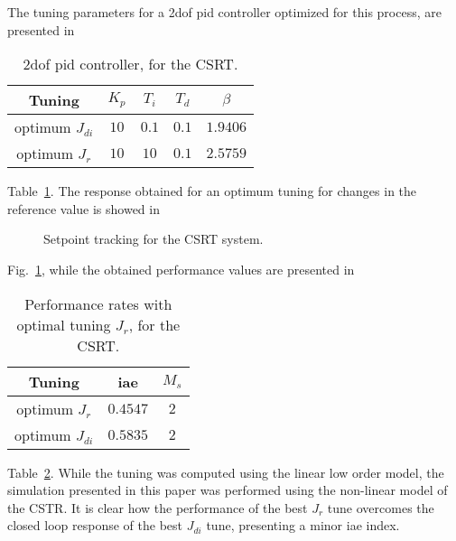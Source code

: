 The tuning parameters for a \gls{2dof} \gls{pid} controller optimized for this process, are presented in %
%
\begin{table}
	\caption{\gls{2dof} \gls{pid} controller, for the CSRT.}
	\centering
	\begin{tabular}{@{}*{5}{c}@{}}
		\toprule
		Tuning              &$K_p$       &$T_i$      &$T_d$     & $\beta$ 	\\
		\midrule              
		optimum $J_{di}$     &$10$   & $0.1$  &$0.1$  &$1.9406$   \\
		optimum $J_{r}$      &$10$   & $10$  &$0.1$  &$2.5759$   \\
		\bottomrule				
	\end{tabular}
	\label{tab:parametrosCSRT}
\end{table}
%
Table~\ref{tab:parametrosCSRT}. The response obtained for an optimum tuning for changes in the reference value is showed in %
%
\begin{figure}%
	\centering
	
	\caption{Setpoint tracking for the CSRT system.}%
	\label{fig:cambiorCSRT}%
\end{figure}
%
Fig.~\ref{fig:cambiorCSRT}, while the obtained performance values are presented in %
%
\begin{table}
	\caption{Performance rates with optimal tuning $J_{r}$, for the CSRT.}
	\centering
	\begin{tabular}{@{}*{3}{c}@{}}
		\toprule
		Tuning             &\gls{iae}        &$M_s$   \\
		\midrule              
		optimum $J_{r}$     &$0.4547$   & $2$    \\
		optimum $J_{di}$    &$0.5835$   & $2$    \\
		\bottomrule				
	\end{tabular}
	\label{tab:IAErCSRT}
\end{table}
%
Table~\ref{tab:IAErCSRT}. While the tuning was computed using the linear low order model, the simulation presented in this paper was performed using the non-linear model of the CSTR. It is clear how the performance of the best $J_{r}$ tune overcomes the closed loop response of the best $J_{di}$ tune, presenting a minor \gls{iae} index.


